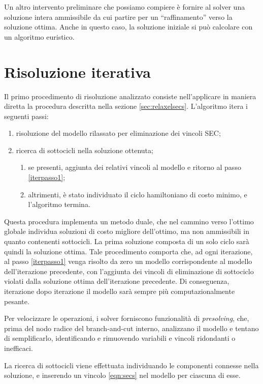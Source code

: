 Un altro intervento preliminare che possiamo compiere è fornire al solver una soluzione intera ammissibile da cui partire per un ``raffinamento'' verso la soluzione ottima. Anche in questo caso, la soluzione iniziale si può calcolare con un algoritmo euristico.

\section{Risoluzione iterativa}
Il primo procedimento di risoluzione analizzato consiste nell'applicare in maniera diretta la procedura descritta nella sezione \ref{sec:relaxelsecs}. L'algoritmo itera i seguenti passi:
\begin{enumerate}[noitemsep]
  \item risoluzione del modello rilassato per eliminazione dei vincoli SEC;\label{iterpasso1}
  \item ricerca di sottocicli nella soluzione ottenuta;
  \begin{enumerate}[noitemsep]
    \item se presenti, aggiunta dei relativi vincoli al modello e ritorno al passo \ref{iterpasso1};
    \item altrimenti, è stato individuato il ciclo hamiltoniano di costo minimo, e l'algoritmo termina.
  \end{enumerate}
\end{enumerate}

Questa procedura implementa un metodo duale, che nel cammino verso l'ottimo globale individua soluzioni di costo migliore dell'ottimo, ma non ammissibili in quanto contenenti sottocicli. La prima soluzione composta di un solo ciclo sarà quindi la soluzione ottima. Tale procedimento comporta che, ad ogni iterazione, al passo \ref{iterpasso1} venga risolto da zero un modello corrispondente al modello dell'iterazione precedente, con l'aggiunta dei vincoli di eliminazione di sottociclo violati dalla soluzione ottima dell'iterazione precedente. Di conseguenza, iterazione dopo iterazione il modello sarà sempre più computazionalmente pesante.

Per velocizzare le operazioni, i solver forniscono funzionalità di \textit{presolving}, che, prima del nodo radice del branch-and-cut interno, analizzano il modello e tentano di semplificarlo, identificando e rimuovendo variabili e vincoli ridondanti o inefficaci.

La ricerca di sottocicli viene effettuata individuando le componenti connesse nella soluzione, e inserendo un vincolo \ref{eqn:secs} nel modello per ciascuna di esse.

